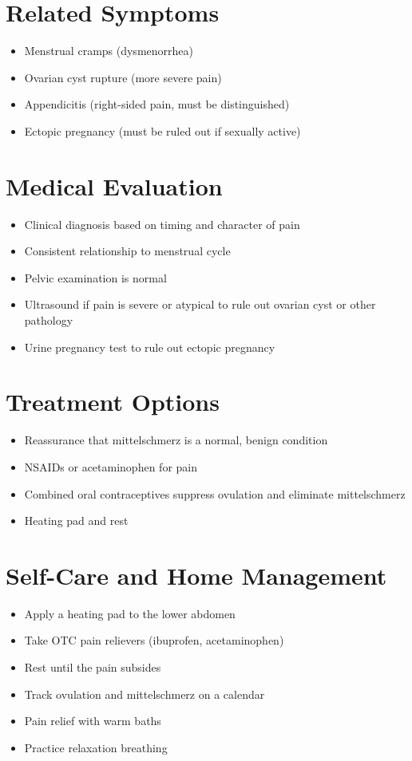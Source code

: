 \section*{Related Symptoms}
\begin{itemize}
\item Menstrual cramps (dysmenorrhea)
\item Ovarian cyst rupture (more severe pain)
\item Appendicitis (right-sided pain, must be distinguished)
\item Ectopic pregnancy (must be ruled out if sexually active)
\end{itemize}

\section*{Medical Evaluation}
\begin{itemize}
\item Clinical diagnosis based on timing and character of pain
\item Consistent relationship to menstrual cycle
\item Pelvic examination is normal
\item Ultrasound if pain is severe or atypical to rule out ovarian cyst or other pathology
\item Urine pregnancy test to rule out ectopic pregnancy
\end{itemize}

\section*{Treatment Options}
\begin{itemize}
\item Reassurance that mittelschmerz is a normal, benign condition
\item NSAIDs or acetaminophen for pain
\item Combined oral contraceptives suppress ovulation and eliminate mittelschmerz
\item Heating pad and rest
\end{itemize}

\section*{Self-Care and Home Management}
\begin{itemize}
\item Apply a heating pad to the lower abdomen
\item Take OTC pain relievers (ibuprofen, acetaminophen)
\item Rest until the pain subsides
\item Track ovulation and mittelschmerz on a calendar
\item Pain relief with warm baths
\item Practice relaxation breathing
\end{itemize}

